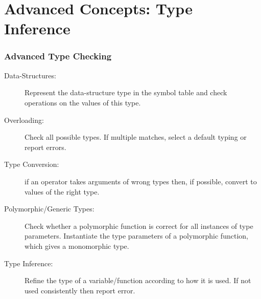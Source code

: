 \documentclass{beamer}
\begin{document}
\section{Advanced Concepts: Type Inference}

\begin{frame}[fragile]
	\tableofcontents[currentsection]
\end{frame}


\begin{frame}[fragile,t]
   \frametitle{Advanced Type Checking}

\bigskip

\begin{description}
    \item[Data-Structures:] Represent the data-structure type in the symbol
            table and check operations on the values of this type.\smallskip

    \item[Overloading:] Check all possible types. If multiple matches, 
            select a default typing or report errors.\smallskip

    \item[Type Conversion:] if an operator takes arguments of wrong types
            then, if possible, convert to values of the right type.\smallskip

    \item[Polymorphic/Generic Types:] Check whether a polymorphic function
            is correct for all instances of type parameters.
            Instantiate the type parameters of a polymorphic
            function, which gives a monomorphic type.\smallskip

    \item[Type Inference:] Refine the type of a variable/function according to
            how it is used. If not used consistently then report error.
\end{description}

\end{frame}
\end{document}
